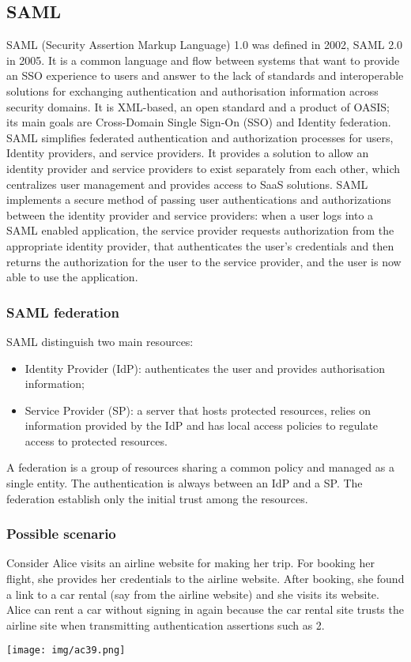 \documentclass[a4paper, 10pt, titlepage]{article}
\begin{document}
\subsection{SAML}
SAML (Security Assertion Markup Language) 1.0 was defined in 2002, SAML 2.0 in 2005. It is a common language and flow between systems that want to provide an SSO experience to users and answer to the lack of standards and interoperable solutions for exchanging authentication and authorisation information across security domains. It is XML-based, an open standard and a product of OASIS; its main goals are Cross-Domain Single Sign-On (SSO) and Identity federation.\medskip\\
SAML simplifies federated authentication and authorization processes for users, Identity providers, and service providers. It provides a solution to allow an identity provider and service providers to exist separately from each other, which centralizes user management and provides access to SaaS solutions. SAML implements a secure method of passing user authentications and authorizations between the identity provider and service providers: when a user logs into a SAML enabled application, the service provider requests authorization from the appropriate identity provider, that authenticates the user’s credentials and then returns the authorization for the user to the service provider, and the user is now able to use the application. 

\subsubsection{SAML federation}
SAML distinguish two main resources:
\begin{itemize}
\item Identity Provider (IdP): authenticates the user and provides authorisation information;
\item Service Provider (SP): a server that hosts protected resources, relies on information provided by the IdP and has local access policies to regulate access to protected resources.
\end{itemize}
A federation is a group of resources sharing a common policy and managed as a single entity. The authentication is always between an IdP and a SP. The federation establish only the initial trust among the resources.

\subsubsection*{Possible scenario}
Consider Alice visits an airline website for making her trip. For booking her flight, she provides her credentials to the airline website. After booking, she found a link to a car rental (say from the airline website) and she visits its website. Alice can rent a car without signing in again because the car rental site trusts the airline site when transmitting authentication assertions such as 2.
\begin{center}
\texttt{[image: img/ac39.png]}
\end{center}
\end{document}
